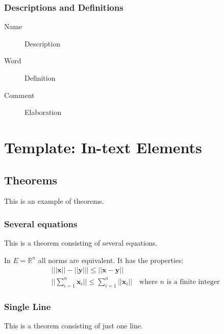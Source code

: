 \subsection{Descriptions and Definitions}

\begin{description}
  \item[Name] Description
  \item[Word] Definition
  \item[Comment] Elaboration
\end{description}



\chapter{Template: In-text Elements}

\section{Theorems}

This is an example of theorems.

\subsection{Several equations}
This is a theorem consisting of several equations.

\begin{theorem}
  In $E=\mathbb{R}^n$ all norms are equivalent. It has the properties:
  \begin{align}
     & \big| ||\mathbf{x}|| - ||\mathbf{y}|| \big|\leq || \mathbf{x}- \mathbf{y}||                            \\
     & ||\sum_{i=1}^n\mathbf{x}_i||\leq \sum_{i=1}^n||\mathbf{x}_i||\quad\text{where $n$ is a finite integer}
  \end{align}
\end{theorem}

\subsection{Single Line}
This is a theorem consisting of just one line.

